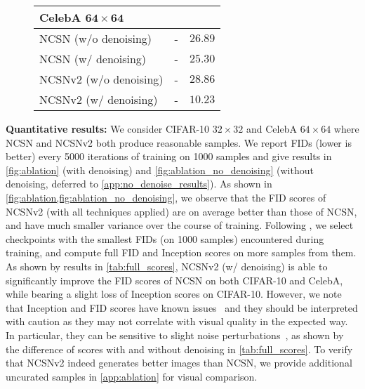 \documentclass{article}
\begin{document}
\begin{figure}
\begin{minipage}{0.45\textwidth}
\begin{adjustbox}{max width=0.9\linewidth}
\begin{tabular}{lcc}
                \midrule
                \multicolumn{3}{l}{\textbf{CelebA $\mathbf{64\times 64}$}}\\
                \midrule
                NCSN (w/o denoising) & - & $26.89$ \\
                NCSN (w/ denoising) & - & $25.30$\\
                NCSNv2 (w/o denoising) & - & $28.86$\\
                NCSNv2 (w/ denoising) & - & $\mathbf{10.23}$\\
                \bottomrule
            \end{tabular} 
            \end{adjustbox}
    \end{minipage}
\end{figure}

\textbf{Quantitative results:} We consider CIFAR-10 $32\times 32$ and CelebA $64\times 64$ where NCSN and NCSNv2 both produce reasonable samples. We report FIDs (lower is better) every 5000 iterations of training on 1000 samples and give results in \cref{fig:ablation} (with denoising) and \cref{fig:ablation_no_denoising} (without denoising, deferred to \cref{app:no_denoise_results}). As shown in \cref{fig:ablation,fig:ablation_no_denoising}, we observe that the FID scores of NCSNv2 (with all techniques applied) are on average better than those of NCSN, and have much smaller variance over the course of training. 
Following \cite{song2019generative}, we select checkpoints with the smallest FIDs (on 1000 samples) encountered during training, and compute full FID and Inception scores on more samples from them. As shown by results in \cref{tab:full_scores}, NCSNv2 (w/ denoising) is able to significantly improve the FID scores of NCSN on both CIFAR-10 and CelebA, while bearing a slight loss of Inception scores on CIFAR-10. However, we note that Inception and FID scores have known issues~\cite{barratt2018note,sajjadi2018assessing} and they should be interpreted with caution as they may not correlate with visual quality in the expected way. In particular, they can be sensitive to slight noise perturbations~\cite{razavi2019generating}, as shown by the difference of scores with and without denoising in \cref{tab:full_scores}. To verify that NCSNv2 indeed generates better images than NCSN, we provide additional uncurated samples in \cref{app:ablation} for visual comparison.
\end{document}
